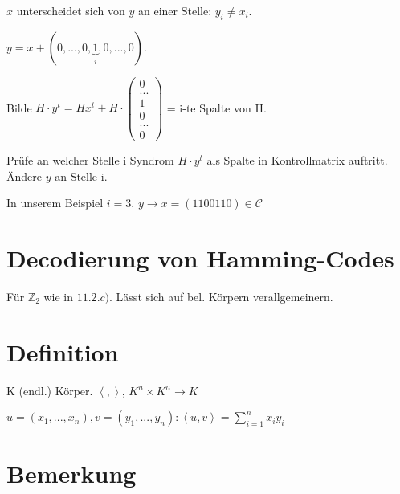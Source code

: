 \documentclass[a4paper, openany]{book}
\begin{document}
\begin{enumerate}[label=(\alph*)]
	$x$ unterscheidet sich von $y$ an einer Stelle: $y_i \neq x_i$.

	\par \medskip

	$y = x + (0,...,0,\underbrace{1}_{i},0,...,0)$.

	Bilde $H \cdot y^t = Hx^t + H \cdot \begin{pmatrix}0 \\ ... \\ 1 \\ 0 \\ ... \\ 0 \end{pmatrix}$ = i-te Spalte von H.

	\par \medskip

	Prüfe an welcher Stelle i Syndrom $H \cdot y^t$ als Spalte in Kontrollmatrix auftritt. Ändere $y$ an Stelle i.

	\par \medskip

	In unserem Beispiel $i = 3$. $y \rightarrow x = (1100110) \in \mathcal{C}$
\end{enumerate}

\section{Decodierung von Hamming-Codes}

Für $\mathbb{Z}_2$ wie in $11.2.c)$. Lässt sich auf bel. Körpern verallgemeinern.

\section{Definition}

K (endl.) Körper. $\left \langle , \right \rangle$, $K^n \times K^n \rightarrow K$

\par \medskip

$u = (x_1, ..., x_n), v = (y_1, ..., y_n) : \left \langle u,v \right \rangle = \sum_{i=1}^n x_i y_i$

\section{Bemerkung}
\end{document}
